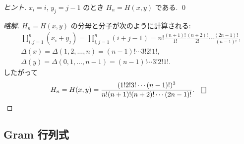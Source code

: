 \documentclass[12pt,twoside]{jarticle}
\newcommand\commentout[1]{#1}
\newcommand\commentout[1]{}
\begin{document}
\begin{proof}[ヒント]
  $x_i=i$, $y_j=j-1$ のとき $H_n=H(x,y)$ である. 
  \qed
\end{proof}

\commentout{
\begin{proof}[略解]
  $H_n=H(x,y)$ の分母と分子が次のように計算される:
  \begin{align*}
    &
    \prod_{i,j=1}^n (x_i+y_j)=\prod_{i,j=1}^n (i+j-1)
    =n!\frac{(n+1)!}{1!}\frac{(n+2)!}{2!}\cdots\frac{(2n-1)!}{(n-1)!},
    \\ &
    \Delta(x) = \Delta(1,2,\ldots,n) = (n-1)!\cdots3!2!1!,
    \\ &
    \Delta(y) = \Delta(0,1,\ldots,n-1) = (n-1)!\cdots3!2!1!.
  \end{align*}
  したがって
  \begin{equation*}
    H_n = H(x,y)
    = \frac{(1!2!3!\cdots(n-1)!)^3}{n!(n+1)!(n+2)!\cdots(2n-1)!}.
    \qed
  \end{equation*}
\end{proof}
}


\subsection{Gram 行列式}
\end{document}
